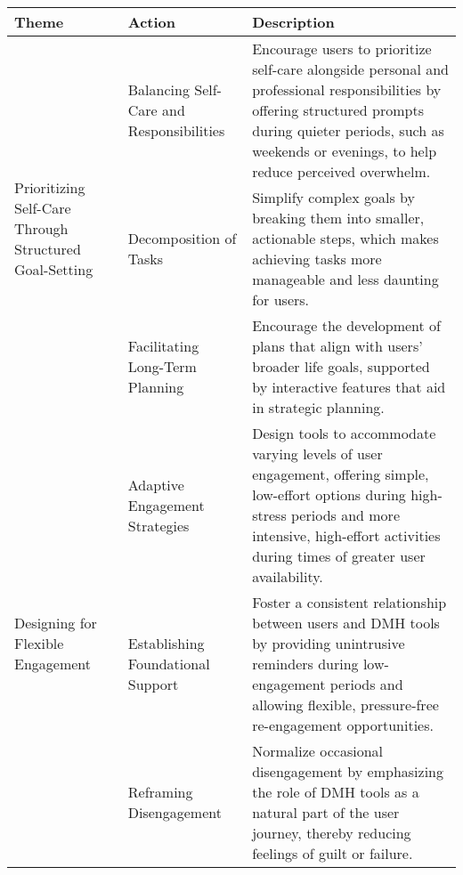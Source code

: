     

\begin{table}[ht]

\caption{}
\label{tab:socio_technical_solutions}
\centering
\begin{renv}

\begin{tabular}{|p{3cm}|p{3cm}|p{7cm}|}
\hline
\textbf{Theme} & \textbf{Action} & \textbf{Description} \\ \hline
\multirow[t]{3}{3cm}{Prioritizing Self-Care Through Structured Goal-Setting} 
& \raggedright Balancing Self-Care and Responsibilities & Encourage users to prioritize self-care alongside personal and professional responsibilities by offering structured prompts during quieter periods, such as weekends or evenings, to help reduce perceived overwhelm. \\ \cline{2-3}
& \raggedright Decomposition of Tasks & Simplify complex goals by breaking them into smaller, actionable steps, which makes achieving tasks more manageable and less daunting for users. \\ \cline{2-3}
& \raggedright Facilitating Long-Term Planning & Encourage the development of plans that align with users' broader life goals, supported by interactive features that aid in strategic planning. \\ \cline{1-3}

\multirow[t]{3}{3cm}{Designing for Flexible Engagement} 
& \raggedright Adaptive Engagement Strategies & Design tools to accommodate varying levels of user engagement, offering simple, low-effort options during high-stress periods and more intensive, high-effort activities during times of greater user availability. \\ \cline{2-3}
& \raggedright Establishing Foundational Support & Foster a consistent relationship between users and DMH tools by providing unintrusive reminders during low-engagement periods and allowing flexible, pressure-free re-engagement opportunities. \\ \cline{2-3}
& \raggedright Reframing Disengagement & Normalize occasional disengagement by emphasizing the role of DMH tools as a natural part of the user journey, thereby reducing feelings of guilt or failure. \\ \cline{1-3}


\end{tabular}
\end{renv}
\end{table}
